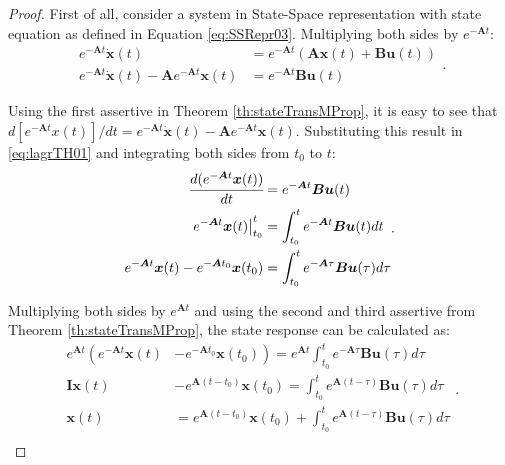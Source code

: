 \documentclass[a4paper,11pt]{book}
\numberwithin{figure}{chapter}
\numberwithin{equation}{chapter}
\numberwithin{table}{chapter}
\theoremstyle{definition}
\begin{document}
\begin{proof}
    First of all, consider a system in State-Space representation with state equation as defined in Equation \eqref{eq:SSRepr03}. Multiplying both sides by $e^{-\bm{A} t}$:
    \begin{equation} \label{eq:lagrTH01}
    \begin{split}
        e^{-\bm{A} t} \dot{\bm{x}}(t) &= e^{-\bm{A} t} (\bm{A} \bm{x}(t) + \bm{B} \bm{u}(t)) \\
        e^{-\bm{A} t} \dot{\bm{x}}(t) - \bm{A}e^{-\bm{A} t} \bm{x}(t)  &=  e^{-\bm{A} t} \bm{B} \bm{u}(t)
    \end{split}
    .\end{equation}
    
    Using the first assertive in Theorem \ref{th:stateTransMProp}, it is easy to see that $d[e^{-\bm{A} t} x(t)]/dt = e^{-\bm{A} t} \dot{\bm{x}}(t) - \bm{A} e^{-\bm{A} t} \bm{x}(t)$. Substituting this result in \eqref{eq:lagrTH01} and integrating both sides from $t_0$ to $t$:
    \begin{equation} \label{eq:lagrTH02}
    \begin{split}
        \cfrac{d(e^{-\bm{A} t} \bm{x}(t))}{dt} &= e^{-\bm{A} t} \bm{B} \bm{u}(t) \\
        \left. e^{-\bm{A} t} \bm{x}(t) \right|^{t}_{t_0}  &= \int_{t_0}^{t} e^{-\bm{A} t} \bm{B} \bm{u}(t) dt \\
        e^{-\bm{A} t} \bm{x}(t) - e^{-\bm{A} t_0} \bm{x}(t_0)  &= \int_{t_0}^{t} e^{-\bm{A} \tau} \bm{B} \bm{u}(\tau) d\tau
    \end{split}
    .\end{equation}
    
    Multiplying both sides by $e^{\bm{A} t}$ and using the second and third assertive from Theorem \ref{th:stateTransMProp}, the state response can be calculated as:
    \begin{equation} \label{eq:lagrTH03}
    \begin{split}
        e^{\bm{A} t} \left( e^{-\bm{A} t} \bm{x}(t) \right. &- \left. e^{-\bm{A} t_0} \bm{x}(t_0) \right) = e^{\bm{A} t} \int_{t_0}^{t} e^{-\bm{A} \tau} \bm{B} \bm{u}(\tau) d\tau \\
        \bm{I} \bm{x}(t) &- e^{\bm{A} (t - t_0)} \bm{x}(t_0) = \int_{t_0}^{t} e^{\bm{A}(t - \tau)} \bm{B} \bm{u}(\tau) d\tau \\
        \bm{x}(t) &= e^{\bm{A} (t - t_0)} \bm{x}(t_0) + \int_{t_0}^{t} e^{\bm{A}(t - \tau)} \bm{B} \bm{u}(\tau) d\tau \\
    \end{split}
    .\end{equation}
    

\end{proof}
\end{document}
